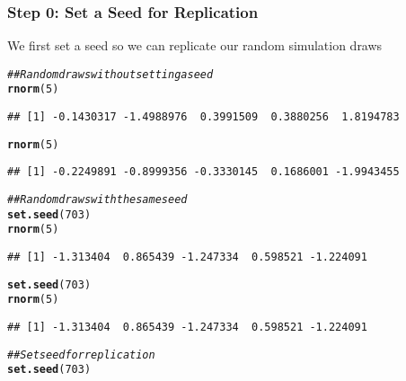 \documentclass{beamer}\usepackage[]{graphicx}\usepackage[]{color}
\makeatletter
\newcommand{\hlnum}[1]{\textcolor[rgb]{0.686,0.059,0.569}{#1}}%
\newcommand{\hlcom}[1]{\textcolor[rgb]{0.678,0.584,0.686}{\textit{#1}}}%
\newcommand{\hlstd}[1]{\textcolor[rgb]{0.345,0.345,0.345}{#1}}%
\newcommand{\hlkwd}[1]{\textcolor[rgb]{0.737,0.353,0.396}{\textbf{#1}}}%
\newenvironment{kframe}{%
 \def\at@end@of@kframe{}%
 \ifinner\ifhmode%
  \def\at@end@of@kframe{\end{minipage}}%
  \begin{minipage}{\columnwidth}%
 \fi\fi%
 \def\FrameCommand##1{\hskip\@totalleftmargin \hskip-\fboxsep
 \colorbox{shadecolor}{##1}\hskip-\fboxsep
     \hskip-\linewidth \hskip-\@totalleftmargin \hskip\columnwidth}%
 \MakeFramed {\advance\hsize-\width
   \@totalleftmargin\z@ \linewidth\hsize
   \@setminipage}}%
 {\par\unskip\endMakeFramed%
 \at@end@of@kframe}
\newenvironment{knitrout}{}{} %
\makeatother
\begin{document}
\begin{frame}[fragile]\frametitle{Step 0: Set a Seed for Replication}
	We first set a seed so we can replicate our random simulation draws 
    \vspace{1ex}
\begin{knitrout}\footnotesize
{}\color{fgcolor}\begin{kframe}
\begin{alltt}
\hlcom{## Random draws without setting a seed}
\hlkwd{rnorm}\hlstd{(}\hlnum{5}\hlstd{)}
\end{alltt}
\begin{verbatim}
## [1] -0.1430317 -1.4988976  0.3991509  0.3880256  1.8194783
\end{verbatim}
\begin{alltt}
\hlkwd{rnorm}\hlstd{(}\hlnum{5}\hlstd{)}
\end{alltt}
\begin{verbatim}
## [1] -0.2249891 -0.8999356 -0.3330145  0.1686001 -1.9943455
\end{verbatim}
\begin{alltt}
\hlcom{## Random draws with the same seed}
\hlkwd{set.seed}\hlstd{(}\hlnum{703}\hlstd{)}
\hlkwd{rnorm}\hlstd{(}\hlnum{5}\hlstd{)}
\end{alltt}
\begin{verbatim}
## [1] -1.313404  0.865439 -1.247334  0.598521 -1.224091
\end{verbatim}
\begin{alltt}
\hlkwd{set.seed}\hlstd{(}\hlnum{703}\hlstd{)}
\hlkwd{rnorm}\hlstd{(}\hlnum{5}\hlstd{)}
\end{alltt}
\begin{verbatim}
## [1] -1.313404  0.865439 -1.247334  0.598521 -1.224091
\end{verbatim}
\begin{alltt}
\hlcom{## Set seed for replication}
\hlkwd{set.seed}\hlstd{(}\hlnum{703}\hlstd{)}
\end{alltt}
\end{kframe}
\end{knitrout}
\end{frame}
\end{document}

